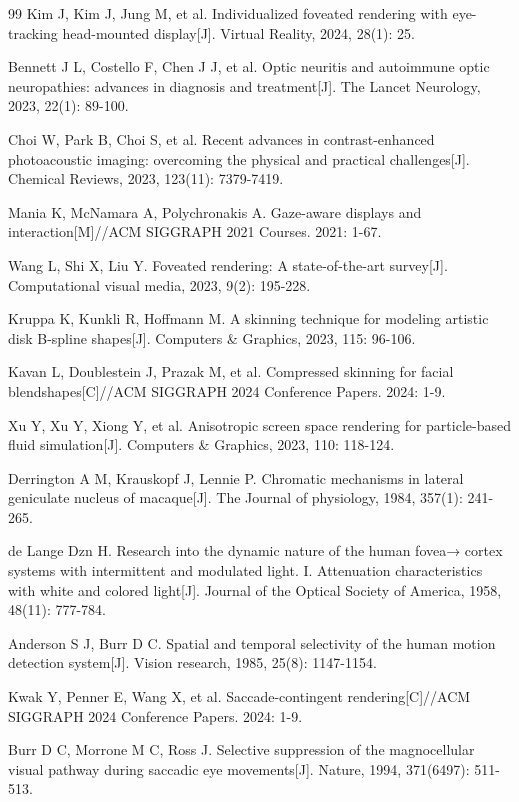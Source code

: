 \begin{thebibliography}{99}
Kim J, Kim J, Jung M, et al. Individualized foveated rendering with eye-tracking head-mounted display[J]. Virtual Reality, 2024, 28(1): 25.


Bennett J L, Costello F, Chen J J, et al. Optic neuritis and autoimmune optic neuropathies: advances in diagnosis and treatment[J]. The Lancet Neurology, 2023, 22(1): 89-100.

Choi W, Park B, Choi S, et al. Recent advances in contrast-enhanced photoacoustic imaging: overcoming the physical and practical challenges[J]. Chemical Reviews, 2023, 123(11): 7379-7419.

Mania K, McNamara A, Polychronakis A. Gaze-aware displays and interaction[M]//ACM SIGGRAPH 2021 Courses. 2021: 1-67.

Wang L, Shi X, Liu Y. Foveated rendering: A state-of-the-art survey[J]. Computational visual media, 2023, 9(2): 195-228.


Kruppa K, Kunkli R, Hoffmann M. A skinning technique for modeling artistic disk B-spline shapes[J]. Computers \& Graphics, 2023, 115: 96-106.

Kavan L, Doublestein J, Prazak M, et al. Compressed skinning for facial blendshapes[C]//ACM SIGGRAPH 2024 Conference Papers. 2024: 1-9.

Xu Y, Xu Y, Xiong Y, et al. Anisotropic screen space rendering for particle-based fluid simulation[J]. Computers \& Graphics, 2023, 110: 118-124.

Derrington A M, Krauskopf J, Lennie P. Chromatic mechanisms in lateral geniculate nucleus of macaque[J]. The Journal of physiology, 1984, 357(1): 241-265.

de Lange Dzn H. Research into the dynamic nature of the human fovea→ cortex systems with intermittent and modulated light. I. Attenuation characteristics with white and colored light[J]. Journal of the Optical Society of America, 1958, 48(11): 777-784.


Anderson S J, Burr D C. Spatial and temporal selectivity of the human motion detection system[J]. Vision research, 1985, 25(8): 1147-1154.

Kwak Y, Penner E, Wang X, et al. Saccade-contingent rendering[C]//ACM SIGGRAPH 2024 Conference Papers. 2024: 1-9.

Burr D C, Morrone M C, Ross J. Selective suppression of the magnocellular visual pathway during saccadic eye movements[J]. Nature, 1994, 371(6497): 511-513.


\end{thebibliography}
